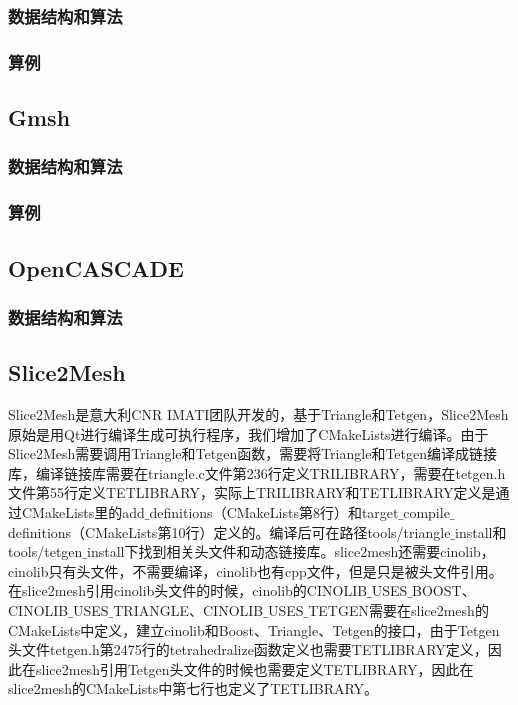 \subsubsection{数据结构和算法}

\subsubsection{算例}

\subsection{Gmsh}

\subsubsection{数据结构和算法}

\subsubsection{算例}

\subsection{OpenCASCADE}

\subsubsection{数据结构和算法}

\subsection{Slice2Mesh}

Slice2Mesh是意大利CNR IMATI团队开发的，基于Triangle和Tetgen，Slice2Mesh原始是用Qt进行编译生成可执行程序，我们增加了CMakeLists进行编译。由于Slice2Mesh需要调用Triangle和Tetgen函数，需要将Triangle和Tetgen编译成链接库，编译链接库需要在triangle.c文件第236行定义TRILIBRARY，需要在tetgen.h文件第55行定义TETLIBRARY，实际上TRILIBRARY和TETLIBRARY定义是通过CMakeLists里的add$\_$definitions（CMakeLists第8行）和target$\_$compile$\_$definitions（CMakeLists第10行）定义的。编译后可在路径tools/triangle$\_$install和tools/tetgen$\_$install下找到相关头文件和动态链接库。slice2mesh还需要cinolib，cinolib只有头文件，不需要编译，cinolib也有cpp文件，但是只是被头文件引用。在slice2mesh引用cinolib头文件的时候，cinolib的CINOLIB$\_$USES$\_$BOOST、CINOLIB$\_$USES$\_$TRIANGLE、CINOLIB$\_$USES$\_$TETGEN需要在slice2mesh的CMakeLists中定义，建立cinolib和Boost、Triangle、Tetgen的接口，由于Tetgen头文件tetgen.h第2475行的tetrahedralize函数定义也需要TETLIBRARY定义，因此在slice2mesh引用Tetgen头文件的时候也需要定义TETLIBRARY，因此在slice2mesh的CMakeLists中第七行也定义了TETLIBRARY。

